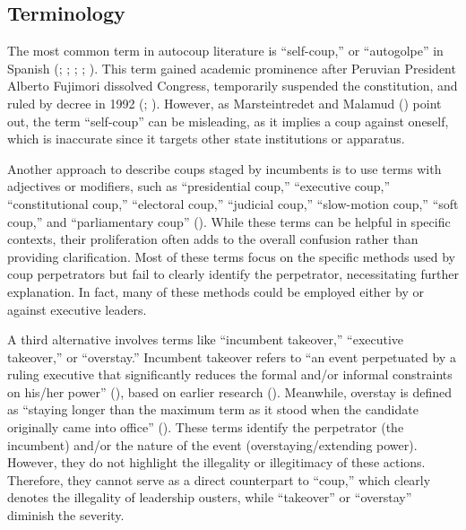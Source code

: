 \documentclass[
  12pt,
]{report}
\begin{document}
\subsection{Terminology}\label{terminology}

The most common term in autocoup literature is ``self-coup,'' or
``autogolpe'' in Spanish (; ;
; ; ). This term gained academic prominence after Peruvian President
Alberto Fujimori dissolved Congress, temporarily suspended the
constitution, and ruled by decree in 1992
(;
). However, as
Marsteintredet and Malamud ()
point out, the term ``self-coup'' can be misleading, as it implies a
coup against oneself, which is inaccurate since it targets other state
institutions or apparatus.

Another approach to describe coups staged by incumbents is to use terms
with adjectives or modifiers, such as ``presidential coup,'' ``executive
coup,'' ``constitutional coup,'' ``electoral coup,'' ``judicial coup,''
``slow-motion coup,'' ``soft coup,'' and ``parliamentary coup''
().
While these terms can be helpful in specific contexts, their
proliferation often adds to the overall confusion rather than providing
clarification. Most of these terms focus on the specific methods used by
coup perpetrators but fail to clearly identify the perpetrator,
necessitating further explanation. In fact, many of these methods could
be employed either by or against executive leaders.

A third alternative involves terms like ``incumbent takeover,''
``executive takeover,'' or ``overstay.'' Incumbent takeover refers to
``an event perpetuated by a ruling executive that significantly reduces
the formal and/or informal constraints on his/her power''
(), based on
earlier research (). Meanwhile,
overstay is defined as ``staying longer than the maximum term as it
stood when the candidate originally came into office''
(). These terms identify the perpetrator (the incumbent) and/or the
nature of the event (overstaying/extending power). However, they do not
highlight the illegality or illegitimacy of these actions. Therefore,
they cannot serve as a direct counterpart to ``coup,'' which clearly
denotes the illegality of leadership ousters, while ``takeover'' or
``overstay'' diminish the severity.
\end{document}
